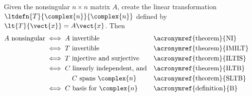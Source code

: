 Given the nonsingular $n\times n$ matrix $A$, create the linear transformation $\ltdefn{T}{\complex{n}}{\complex{n}}$ defined by $\lt{T}{\vect{x}}=A\vect{x}$.  Then
%
\begin{align*}
A\text{ nonsingular}
%
&\iff A\text{ invertible}
&&\text{\acronymref{theorem}{NI}}\\
%
&\iff T\text{ invertible}
&&\text{\acronymref{theorem}{IMILT}}\\
%
&\iff T\text{ injective and surjective}
&&\text{\acronymref{theorem}{ILTIS}}\\
%
&\iff C\text{ linearly independent, and}
&&\text{\acronymref{theorem}{ILTB}}\\
&\quad\quad\quad\quad C\text{ spans }\complex{n}
&&\text{\acronymref{theorem}{SLTB}}\\
%
&\iff C\text{ basis for }\complex{n}
&&\text{\acronymref{definition}{B}}
%
\end{align*}
%